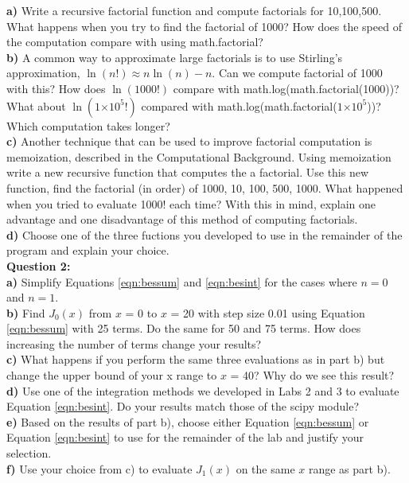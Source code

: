 \documentclass[a4paper,12pt]{article}
\providecommand{\e}[1]{\ensuremath{\times 10^{#1}}}
\begin{document}
\textbf{a)} Write a recursive factorial function and compute factorials for 10,100,500. What happens when you try to find the factorial of 1000? How does the speed of the computation compare with using math.factorial?\\
\textbf{b)} A common way to approximate large factorials is to use Stirling's approximation, $\ln(n!) \approx n\ln(n) - n$. Can we compute factorial of 1000 with this? How does $\ln(1000!)$ compare with math.log(math.factorial(1000))? What about $\ln(1\e{5}!)$ compared with math.log(math.factorial($1\e{5}$))? Which computation takes longer?\\
\textbf{c)} Another technique that can be used to improve factorial computation is memoization, described in the Computational Background. Using memoization write a new recursive function that computes the a factorial. Use this new function, find the factorial (in order) of 1000, 10, 100, 500, 1000. What happened when you tried to evaluate 1000! each time?  With this in mind, explain one advantage and one disadvantage of this method of computing factorials. \\
\textbf{d)} Choose one of the three fuctions you developed to use in the remainder of the program and explain your choice.\\

\textbf{Question 2:} \\
\textbf{a)} Simplify Equations \ref{eqn:bessum} and \ref{eqn:besint} for the cases where $n = 0$ and $n = 1$.\\
\textbf{b)} Find $J_0(x)$ from $x$ = 0 to $x$ = 20 with step size 0.01 using Equation \ref{eqn:bessum} with 25 terms. Do the same for 50 and 75 terms. How does increasing the number of terms change your results? \\
\textbf{c)} What happens if you perform the same three evaluations as in part b) but change the upper bound of your x range to $x$ = 40? Why do we see this result? \\
\textbf{d)} Use one of the integration methods we developed in Labs 2 and 3 to evaluate Equation \ref{eqn:besint}. Do your results match those of the scipy module?\\
\textbf{e)} Based on the results of part b), choose either Equation \ref{eqn:bessum} or Equation \ref{eqn:besint} to use for the remainder of the lab and justify your selection.\\
\textbf{f)} Use your choice from c) to evaluate $J_1(x)$ on the same $x$ range as part b). \\
\end{document}
